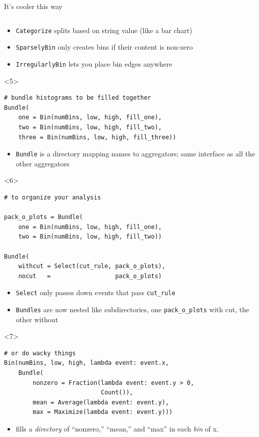 \documentclass{beamer}
\begin{document}
\begin{frame}[fragile]{It's cooler this way}
\begin{onlyenv}
\begin{verbatim}
\end{verbatim}
\begin{itemize}
\item {\tt\small Categorize} splits based on string value (like a bar chart)
\item {\tt\small SparselyBin} only creates bins if their content is non-zero
\item {\tt\small IrregularlyBin} lets you place bin edges anywhere
\end{itemize}\end{onlyenv}
\begin{onlyenv}<5>
\begin{verbatim}
# bundle histograms to be filled together
Bundle(
    one = Bin(numBins, low, high, fill_one),
    two = Bin(numBins, low, high, fill_two),
    three = Bin(numBins, low, high, fill_three))
\end{verbatim}
\begin{itemize}
\item {\tt\small Bundle} is a directory mapping names to aggregators; same interface as all the other aggregators
\end{itemize}\end{onlyenv}
\begin{onlyenv}<6>
\begin{verbatim}
# to organize your analysis

pack_o_plots = Bundle(
    one = Bin(numBins, low, high, fill_one),
    two = Bin(numBins, low, high, fill_two))

Bundle(
    withcut = Select(cut_rule, pack_o_plots),
    nocut   =                  pack_o_plots)
\end{verbatim}
\begin{itemize}
\item {\tt\small Select} only passes down events that pass {\tt\small cut\_rule}
\item {\tt\small Bundles} are now nested like subdirectories, one {\tt\small pack\_o\_plots} with cut, the other without
\end{itemize}\end{onlyenv}
\begin{onlyenv}<7>
\begin{verbatim}
# or do wacky things
Bin(numBins, low, high, lambda event: event.x,
    Bundle(
        nonzero = Fraction(lambda event: event.y > 0,
                           Count()),
        mean = Average(lambda event: event.y),
        max = Maximize(lambda event: event.y)))
\end{verbatim}
\begin{itemize}
\item fills a {\it directory} of ``nonzero,'' ``mean,'' and ``max'' in each {\it bin} of x.
\end{itemize}\end{onlyenv}
\end{frame}
\end{document}
